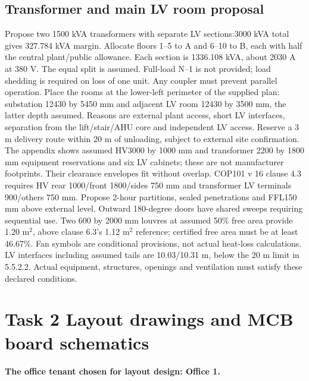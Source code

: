 \documentclass[11pt,a4paper]{article}
\newcommand{\task}[1]{\clearpage\section*{#1}}
\begin{document}
\subsection*{Transformer and main LV room proposal}
Propose two 1500 kVA transformers with separate LV sections:3000 kVA total gives 327.784 kVA margin. Allocate floors 1--5 to A and 6--10 to B, each with half the central plant/public allowance. Each section is 1336.108 kVA, about 2030 A at 380 V. The equal split is assumed. Full-load N--1 is not provided;  load shedding is required on loss of one unit. Any coupler must prevent parallel operation.
Place the rooms at the lower-left perimeter of the supplied plan: substation 12430 by 5450 mm and adjacent LV room 12430 by 3500 mm, the latter depth assumed. Reasons are external plant access, short LV interfaces, separation from the lift/stair/AHU core and independent LV access. Reserve a 3 m delivery route within 20 m of unloading, subject to external site confirmation.
The appendix shows assumed HV3000 by 1000 mm and transformer 2200 by 1800 mm equipment reservations and six LV cabinets;  these are not manufacturer footprints. Their clearance envelopes fit without overlap. COP101 v 16 clause 4.3 requires HV rear 1000/front 1800/sides 750 mm and transformer LV terminals 900/others 750 mm. Propose 2-hour partitions, sealed penetrations and FFL150 mm above external level. Outward 180-degree doors have shared sweeps requiring sequential use.
Two 600 by 2000 mm louvres at assumed 50\% free area provide 1.20 m$^2$, above clause 6.3's 1.12 m$^2$ reference;  certified free area must be at least 46.67\%. Fan symbols are conditional provisions, not actual heat-loss calculations. LV interfaces including assumed tails are 10.03/10.31 m, below the 20 m limit in 5.5.2.2. Actual equipment, structures, openings and ventilation must satisfy these declared conditions.
\task{Task 2 Layout drawings and MCB board schematics}
\textbf{The office tenant chosen for layout design: Office 1.}
\end{document}
